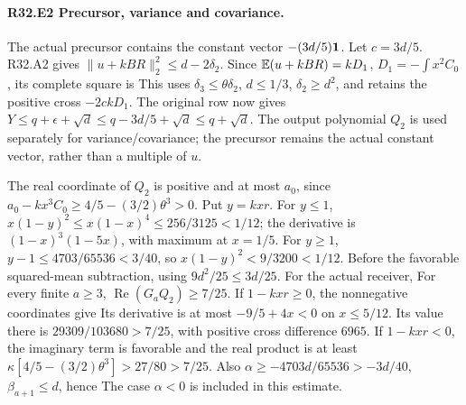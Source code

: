 \paragraph{R32.E2 Precursor, variance and covariance.}
The actual precursor contains the constant vector \(-(3d/5)\mathbf1\).
Let \(c=3d/5\). R32.A2 gives \(\lVert u+kBR\rVert_2^2\le d-2\delta_2\).
Since \(\mathbb E(u+kBR)=kD_1\), \(D_1=-\int x^2C_0\), its complete square is
This uses \(\delta_3\le\theta\delta_2\), \(d\le1/3\), \(\delta_2\ge d^2\),
and retains the positive cross \(-2ckD_1\). The original row now gives
\(Y\le q+\epsilon+\sqrt d\le q-3d/5+\sqrt d\le q+\sqrt d\).
The output polynomial \(Q_2\) is used separately for variance/covariance;
the precursor remains the actual constant vector, rather than a multiple
of \(u\).

The real coordinate of \(Q_2\) is positive and at most \(a_0\), since
\(a_0-kx^3C_0\ge4/5-(3/2)\theta^3>0\). Put \(y=kxr\).
For \(y\le1\),
\(x(1-y)^2\le x(1-x)^4\le256/3125<1/12\); the derivative is
\((1-x)^3(1-5x)\), with maximum at \(x=1/5\).
For \(y\ge1\), \(y-1\le4703/65536<3/40\), so
\(x(1-y)^2<9/3200<1/12\). Before the favorable squared-mean subtraction,
using \(9d^2/25\le3d/25\).
For the actual receiver,
For every finite \(a\ge3\), \(\operatorname{Re}(G_aQ_2)\ge7/25\).
If \(1-kxr\ge0\), the nonnegative coordinates give
Its derivative is at most \(-9/5+4x<0\) on \(x\le5/12\).
Its value there is \(29309/103680>7/25\), with positive cross difference
\(6965\). If \(1-kxr<0\), the imaginary term is favorable and the real
product is at least \(\kappa[4/5-(3/2)\theta^3]>27/80>7/25\).
Also \(\alpha\ge-4703d/65536>-3d/40\), \(\beta_{a+1}\le d\), hence
The case \(\alpha<0\) is included in this estimate.

